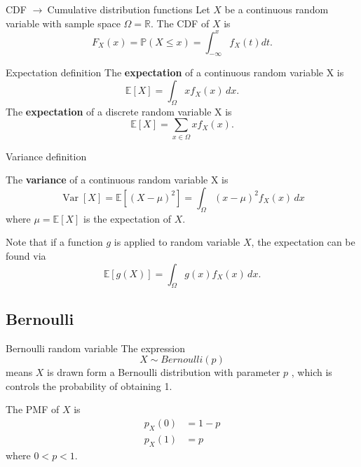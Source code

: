 \documentclass[11pt,a4paper,fleqn]{article}
\numberwithin{equation}{section}
\newcommand{\samplespace}{\Omega}
\newcommand{\g}{$\rightarrow\ $}
\DeclareMathOperator\Var{\mathrm{Var}}
\begin{document}
\begin{fact}{CDF \g Cumulative distribution functions}{}
    Let $X$ be a continuous random variable with sample space $\samplespace=\mathbb{R}$.
    The CDF of $X$ is
    \begin{equation*}
        F_X(x)=\mathbb{P}(X\le x)=\int_{-\infty}^{x}f_X(t)dt.
    \end{equation*}
\end{fact}

\begin{fact}{Expectation definition}{}
    The \textbf{expectation} of a continuous random variable X is
    \begin{equation*}
        \mathbb{E}[X] = \int_{\samplespace}xf_X(x)\,dx.
    \end{equation*}
    The \textbf{expectation} of a discrete random variable X is
    \begin{equation*}
        \mathbb{E}[X]=\sum_{x\in \samplespace}x f_X(x).
    \end{equation*}
\end{fact}

\begin{fact}{Variance definition}{}
    
    The \textbf{variance} of a continuous random variable X is
    \begin{equation*}
        \Var[X] = \mathbb{E}[(X-\mu)^2]=\int_{\samplespace}(x-\mu)^2f_X(x)\,dx
    \end{equation*}
    where $\mu=\mathbb{E}[X]$ is the expectation of $X$.
\end{fact}

Note that if a function $g$ is applied to random variable $X$, the expectation can be found via
\begin{equation*}
    \mathbb{E}[g(X)]=\int_{\samplespace}g(x)f_X(x)\,dx.
\end{equation*}

\subsection{Bernoulli}

\begin{fact}{Bernoulli random variable}{}
    The expression
    \begin{equation*}
        X \sim Bernoulli(p)
    \end{equation*}
    means $X$ is drawn form a Bernoulli distribution with parameter $p$
    , which is controls the probability of obtaining 1.
    
    The PMF of $X$ is
    \begin{align*}
        p_X(0) &= 1-p\\
        p_X(1) &= p
    \end{align*}
    where $0<p<1$.
\end{fact}
\end{document}
